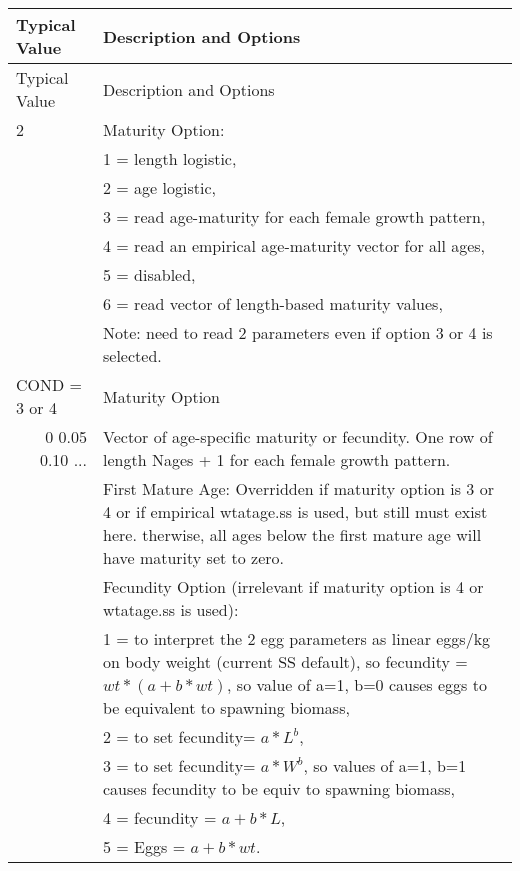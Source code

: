 \begin{longtable}{p{0.5cm} p{2cm} p{13cm}}
	\hline	
	\multicolumn{2}{l}{Typical Value} & Description and Options\Tstrut\Bstrut\\
	\hline
	\endfirsthead

	\hline
	\multicolumn{2}{l}{Typical Value} & Description and Options\Tstrut\Bstrut\\
	\hline
	\endhead
	\hline

	\endfoot
	
	\endlastfoot

	2 & & Maturity Option: \Tstrut\\
	  & & 1 = length logistic,\\
	  & & 2 = age logistic,\\
	  & & 3 = read age-maturity for each female growth pattern,\\
	  & & 4 = read an empirical age-maturity vector for all ages,\\
	  & & 5 = disabled, \\
	  & & 6 = read vector of length-based maturity values,\\
	  & & Note: need to read 2 parameters even if option 3 or 4 is selected.\Bstrut \\
	\hline

	\multicolumn{2}{l}{COND = 3 or 4} & Maturity Option\Tstrut\\
	\multicolumn{2}{r}{0 0.05 0.10 ...} & Vector of age-specific maturity or fecundity.  One row of length Nages + 1 for each female growth pattern. \Bstrut\\
	\hline
	
	\Tstrut 1  & & First Mature Age: Overridden if maturity option is 3 or 4 or if empirical wtatage.ss is used, but still must exist here.  therwise, all ages below the first mature age will have maturity set to zero.\Bstrut\\
	\hline	  

	\Tstrut 1 & & Fecundity Option (irrelevant if maturity option is 4 or wtatage.ss is used):\\
	  & & 1 = to  interpret the 2 egg parameters as linear eggs/kg on body weight (current SS default),  so fecundity = $wt * (a+b*wt)$,  so value of a=1, b=0 causes eggs to be equivalent to spawning biomass,\\
	  & & 2 = to set fecundity= $a*L^ b$,\\
	  & & 3 = to set fecundity= $a*W^ b$, so values of a=1, b=1 causes fecundity to be equiv to spawning biomass,\\
	  & & 4 = fecundity = $a+b*L$,\\
	  & & 5 = Eggs = $a+b*wt$.\Bstrut\\
	\hline
\end{longtable}

